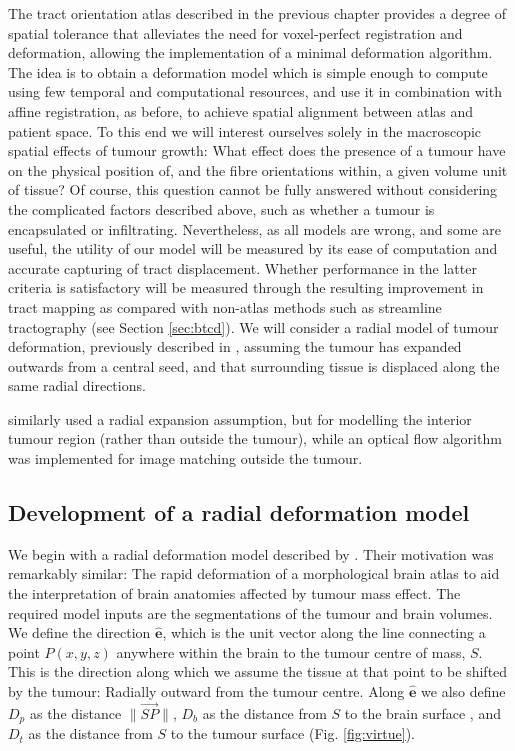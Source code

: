 \documentclass[12pt,phd,a4paper,twoside]{ucl_thesis}
\renewcommand{\textcite}[2][]{
\ifthenelse { \equal {#1} {} }  {\citeauthor{#2}\autocite{#2}}   {\citeauthor{#1}\autocite{#2}}}
\providecommand{\DIFaddtex}[1]{{\protect\color{blue} \sf #1}} %
\providecommand{\DIFaddbegin}{} %
\providecommand{\DIFaddend}{} %
\providecommand{\DIFadd}[1]{\texorpdfstring{\DIFaddtex{#1}}{#1}} %
\newcommand{\DIFaddincludegraphics}[2][]{{\color{blue}\fbox{\DIFOincludegraphics[#1]{#2}}}} %
\DeclareRobustCommand{\DIFaddbegin}{\DIFOaddbegin \let\includegraphics\DIFaddincludegraphics} %
\DeclareRobustCommand{\DIFaddend}{\DIFOaddend \let\includegraphics\DIFOincludegraphics} %
\begin{document}
The tract orientation atlas described in the previous chapter provides a degree of spatial tolerance that alleviates the need for voxel-perfect registration and deformation, allowing the implementation of a minimal deformation algorithm.
The idea is to obtain a deformation model which is simple enough to compute using few temporal and computational resources, and use it in combination with affine registration, as before, to achieve spatial alignment between atlas and patient space.
To this end we will interest ourselves solely in the macroscopic spatial effects of tumour growth:
What effect does the presence of a tumour have on the physical position of, and the fibre orientations within, a given volume unit of tissue?
Of course, this question cannot be fully answered without considering the complicated factors described above, such as whether a tumour is encapsulated or infiltrating.
Nevertheless, as all models are wrong, and some are useful, the utility of our model will be measured by its ease of computation and accurate capturing of tract displacement.
Whether performance in the latter criteria is satisfactory will be measured through the resulting improvement in tract mapping as compared with non-atlas methods such as streamline tractography (see Section \ref{sec:btcd}).
We will consider a radial model of tumour deformation, previously described in \textcite{Young2022}, assuming the tumour has expanded outwards from a central seed, and that surrounding tissue is displaced along the same radial directions.
\textcite{Cuadra2004} similarly used a radial expansion assumption, but for modelling the interior tumour region (rather than outside the tumour), while an optical flow algorithm was implemented for image matching outside the tumour.

\subsection{Development of a radial deformation model}

We begin with a radial deformation model described by \textcite{Nowinski2005}.
Their motivation was remarkably similar:
The rapid deformation of a morphological brain atlas to aid the interpretation of brain anatomies affected by tumour mass effect.
The required model inputs are the segmentations of the tumour and brain volumes.
We define the direction $\mathbf{\hat{e}}$, which is the unit vector along the line connecting a point $P(x,y,z)$ anywhere within the brain to the tumour centre of mass, $S$.
This is the direction along which we assume the tissue at that point to be shifted by the tumour:
Radially outward from the tumour centre.
Along $\mathbf{\hat{e}}$ we also define $D_p$ as the distance  $\|\overrightarrow{SP}\|$, $D_b$ as the distance from $S$ to the brain surface\DIFaddbegin \DIFadd{, }\DIFaddend and $D_t$ as the distance from $S$ to the tumour surface (Fig. \ref{fig:virtue}).
\end{document}
